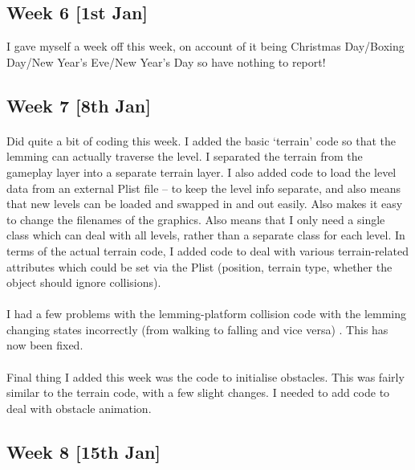 \documentclass[a4paper,oneside]{report}
\begin{document}
\subsection{Week 6 [1st Jan]}

I gave myself a week off this week, on account of it being Christmas Day/Boxing Day/New Year’s Eve/New Year’s Day so have nothing to report!



\subsection{Week 7 [8th Jan]}

\paragraph{} Did quite a bit of coding this week. I added the basic ‘terrain’ code so that the lemming can actually traverse the level. I separated the terrain from the gameplay layer into a separate terrain layer. I also added code to load the level data from an external Plist file – to keep the level info separate, and also means that new levels can be loaded and swapped in and out easily. Also makes it easy to change the filenames of the graphics. Also means that I only need a single class which can deal with all levels, rather than a separate class for each level. In terms of the actual terrain code, I added code to deal with various terrain-related attributes which could be set via the Plist (position, terrain type, whether the object should ignore collisions).

\paragraph{} I had a few problems with the lemming-platform collision code with the lemming changing states incorrectly (from walking to falling and vice versa) . This has now been fixed.

\paragraph{} Final thing I added this week was the code to initialise obstacles. This was fairly similar to the terrain code, with a few slight changes. I needed to add code to deal with obstacle animation.



\subsection{Week 8 [15th Jan]}
\end{document}

